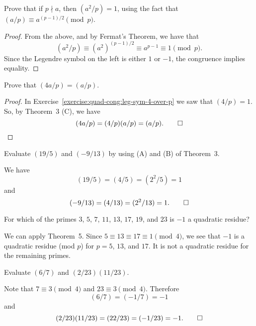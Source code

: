  Prove that if $p\nmid a$, then $(a^2/p) = 1$, using the
fact that $(a/p)\equiv a^{(p-1)/2}\pmod{p}$.
\begin{proof}
  From the above, and by Fermat's Theorem, we have that
  \begin{equation*}
    (a^2/p) \equiv (a^2)^{(p-1)/2} \equiv a^{p-1} \equiv 1\pmod{p}.
  \end{equation*}
  Since the Legendre symbol on the left is either $1$ or $-1$, the
  congruence implies equality.
\end{proof}

 Prove that $(4a/p) = (a/p)$.
\begin{proof}
  In Exercise~\ref{exercise:quad-cong:leg-sym-4-over-p} we saw that
  $(4/p) = 1$. So, by Theorem~3 (C), we have
  \begin{equation*}
    (4a/p) = (4/p)(a/p) = (a/p). \qedhere
  \end{equation*}
\end{proof}

 Evaluate $(19/5)$ and $(-9/13)$ by using (A) and (B) of
Theorem~3.
\begin{solution}
  We have
  \begin{equation*}
    (19/5) = (4/5) = (2^2/5) = 1
  \end{equation*}
  and
  \begin{equation*}
    (-9/13) = (4/13) = (2^2/13) = 1. \qedhere
  \end{equation*}
\end{solution}

 For which of the primes $3$, $5$, $7$, $11$, $13$, $17$,
$19$, and $23$ is $-1$ a quadratic residue?
\begin{solution}
  We can apply Theorem~5. Since $5\equiv13\equiv17\equiv1\pmod{4}$, we
  see that $-1$ is a quadratic residue (mod $p$) for $p = 5$, $13$,
  and $17$. It is not a quadratic residue for the remaining primes.
\end{solution}

 Evaluate $(6/7)$ and $(2/23)(11/23)$.
\begin{solution}
  Note that $7\equiv3\pmod4$ and $23\equiv3\pmod4$. Therefore
  \begin{equation*}
    (6/7) = (-1/7) = -1
  \end{equation*}
  and
  \begin{equation*}
    (2/23)(11/23) = (22/23) = (-1/23) = -1. \qedhere
  \end{equation*}
\end{solution}
